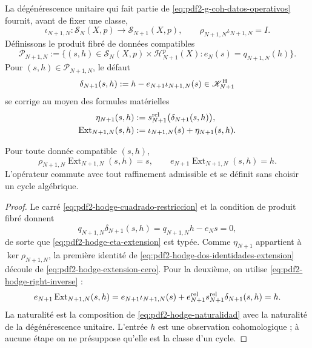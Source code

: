 La dégénérescence unitaire qui fait partie de
\eqref{eq:pdf2-g-coh-datos-operativos} fournit, avant de fixer une classe,
\begin{equation}\label{eq:pdf2-hodge-extension-cero}
 \iota_{N+1,N}:\mathscr S_N(X,p)\longrightarrow\mathscr S_{N+1}(X,p),
 \qquad \rho_{N+1,N}\iota_{N+1,N}=I.
\end{equation}
Définissons le produit fibré de données compatibles
\begin{equation}\label{eq:pdf2-hodge-pullback-extension}
 \mathscr P_{N+1,N}:=
 \{(s,h)\in\mathscr S_N(X,p)\times\mathscr H_{N+1}^p(X):
             e_N(s)=q_{N+1,N}(h)\}.
\end{equation}
Pour $(s,h)\in\mathscr P_{N+1,N}$, le défaut
\begin{equation}\label{eq:pdf2-hodge-defecto-universal}
 \delta_{N+1}(s,h):=
 h-e_{N+1}\iota_{N+1,N}(s)
 \in\mathscr K^{\rm H}_{N+1}
\end{equation}
se corrige au moyen des formules matérielles
\begin{equation}\label{eq:pdf2-hodge-eta-extension}
 \begin{aligned}
  \eta_{N+1}(s,h)&:=
     s_{N+1}^{\rm rel}\bigl(\delta_{N+1}(s,h)\bigr),\\
  \operatorname{Ext}_{N+1,N}(s,h)&:=
     \iota_{N+1,N}(s)+\eta_{N+1}(s,h).
 \end{aligned}
\end{equation}

\begin{theorem}
\label{thm:pdf2-hodge-extension-universal}
Pour toute donnée compatible $(s,h)$,
\begin{equation}\label{eq:pdf2-hodge-dos-identidades-extension}
 \rho_{N+1,N}\operatorname{Ext}_{N+1,N}(s,h)=s,
 \qquad
 e_{N+1}\operatorname{Ext}_{N+1,N}(s,h)=h.
\end{equation}
L'opérateur commute avec tout raffinement admissible et se définit sans choisir
un cycle algébrique.
\end{theorem}

\begin{proof}
Le carré \eqref{eq:pdf2-hodge-cuadrado-restriccion} et la condition de
produit fibré donnent
\[
 q_{N+1,N}\delta_{N+1}(s,h)
 =q_{N+1,N}h-e_Ns=0,
\]
de sorte que \eqref{eq:pdf2-hodge-eta-extension} est typée. Comme
$\eta_{N+1}$ appartient à $\ker\rho_{N+1,N}$, la première identité de
\eqref{eq:pdf2-hodge-dos-identidades-extension} découle de
\eqref{eq:pdf2-hodge-extension-cero}. Pour la deuxième, on utilise
\eqref{eq:pdf2-hodge-right-inverse} :
\[
 e_{N+1}\operatorname{Ext}_{N+1,N}(s,h)
 =e_{N+1}\iota_{N+1,N}(s)
  +e_{N+1}^{\rm rel}s_{N+1}^{\rm rel}\delta_{N+1}(s,h)=h.
\]
La naturalité est la composition de
\eqref{eq:pdf2-hodge-naturalidad} avec la naturalité de la dégénérescence
unitaire. L'entrée $h$ est une observation cohomologique ; à aucune étape
on ne présuppose qu'elle est la classe d'un cycle.
\end{proof}


